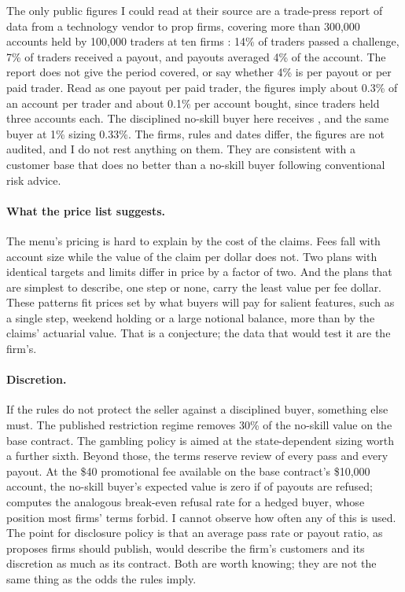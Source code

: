 \documentclass[11pt]{article}
\begin{document}
The only public figures I
could read at their source are a trade-press report of data from a technology vendor to prop firms, covering more
than 300,000 accounts held by 100,000 traders at ten firms \citep{chmiel2024}: 14\% of traders passed a challenge,
7\% of traders received a payout, and payouts averaged 4\% of the account. The report does not give the period
covered, or say whether 4\% is per payout or per paid trader. Read as one payout per paid trader, the figures imply
about 0.3\% of an account per trader and about 0.1\% per account bought, since traders held three accounts each.
The disciplined no-skill buyer here receives \VcoinPct{}, and the same buyer at 1\% sizing 0.33\%. The firms, rules
and dates differ, the figures are not audited, and I do not rest anything on them. They are consistent with a
customer base that does no better than a no-skill buyer following conventional risk advice.

\paragraph{What the price list suggests.} The menu's pricing is hard to explain by the cost of the claims. Fees
fall with account size while the value of the claim per dollar does not. Two plans with identical targets and
limits differ in price by a factor of two. And the plans that are simplest to describe, one step or none, carry
the least value per fee dollar. These patterns fit prices set by what buyers will pay for salient features,
such as a single step, weekend holding or a large notional balance, more than by the claims' actuarial value.
That is a conjecture; the data that would test it are the firm's.

\paragraph{Discretion.} If the rules do not protect the seller against a disciplined buyer, something else must.
The published restriction regime removes 30\% of the no-skill value on the base contract. The gambling policy is
aimed at the state-dependent sizing worth a further sixth. Beyond those, the terms reserve review of every pass
and every payout. At the \$40 promotional fee available on the base contract's \$10,000 account, the no-skill
buyer's expected value is zero if \DenialPromo{} of payouts are refused; \citet{ruether2026} computes the analogous
break-even refusal rate for a hedged buyer, whose position most firms' terms forbid. I cannot observe how often any of this is
used. The point for disclosure policy is that an average pass rate or payout ratio, as \citet{lim2026} proposes
firms should publish, would describe the firm's customers and its discretion as much as its contract. Both are
worth knowing; they are not the same thing as the odds the rules imply.
\end{document}
